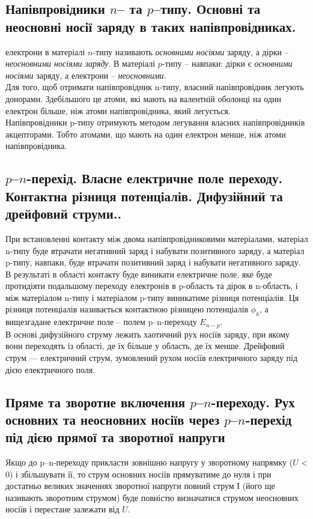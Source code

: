 \subsection{Напівпровідники $n$– та $p$–типу. Основні та неосновні носії заряду в таких напівпровідниках.}
\qquad   електрони в матеріалі $n$-типу називають \emph{основними носіями} заряду, а дірки – \emph{неосновними носіями заряду}. В матеріалі $p$-типу – навпаки: дірки є \emph{основними носіями} заряду, а електрони – \emph{неосновними}.\\
Для того, щоб отримати напівпровідник n-типу, власний напівпровідник легують донорами. Здебільшого це атоми, які мають на валентній оболонці на один електрон більше, ніж атоми напівпровідника, який легується.\\
Напівпровідники p-типу отримують методом легування власних напівпровідників акцепторами. Тобто атомами, що мають на один електрон менше, ніж атоми напівпровідника.
\subsection{$p$–$n$-перехід. Власне електричне поле переходу. Контактна різниця
потенціалів. Дифузійний та дрейфовий струми..}
\qquad
При встановленні контакту між двома напівпровідниковими матеріалами, матеріал n-типу буде втрачати негативний заряд і набувати позитивного заряду, а матеріал p-типу, навпаки, буде втрачати позитивний заряд і набувати негативного заряду. В результаті в області контакту буде виникати електричне поле, яке буде протидіяти подальшому переходу
електронів в p-область та дірок в n-область, і між матеріалом n-типу і матеріалом p-типу виникатиме різниця потенціалів. Ця різниця потенціалів називається контактною різницею потенціалів $\phi_k$, а вищезгадане електричне поле – полем p–n-переходу $E_{n-p}$. \\В основі дифузійного струму лежить хаотичний рух носіїв заряду, при якому вони переходять із області, де їх більше у область, де їх менше. Дрейфовий струм — електричний струм, зумовлений рухом носіїв електричного заряду під дією електричного поля.
\subsection{Пряме та зворотне включення $p$–$n$-переходу. Рух основних та неосновних
носіїв через $p$–$n$-перехід під дією прямої та зворотної напруги}
\qquad
Якщо до p–n-переходу прикласти зовнішню напругу у зворотному
напрямку ($U$ < 0) і збільшувати її, то струм основних носіїв прямуватиме
до нуля і при достатньо великих значеннях зворотної напруги повний
струм І (його ще називають зворотним струмом) буде повністю
визначатися струмом неосновних носіїв і перестане залежати від $U$.
